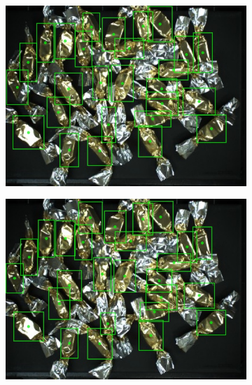 \begin{figure}[H]
\begin{subfigure}{0.5\textwidth}
  \end{subfigure}
  \begin{subfigure}{0.5\textwidth}
    \centering
    \includegraphics[width=\linewidth]{Sources/Figures/appendix/actual_63.jpg}

  \end{subfigure}
  \begin{subfigure}{0.5\textwidth}
    \centering
    \includegraphics[width=\linewidth]{Sources/Figures/appendix/pred_63.jpg}


\end{subfigure}
\end{figure}
